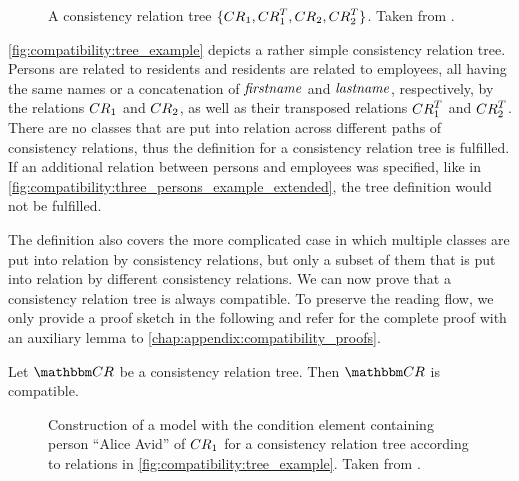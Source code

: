 \begin{figure}
    \centering
    
    \caption[A consistency relation tree]{A consistency relation tree $\setted{\consistencyrelation{CR}{1}, \consistencyrelation{CR}{1}^T, \consistencyrelation{CR}{2}, \consistencyrelation{CR}{2}^T}$. Taken from .}
    \label{fig:compatibility:tree_example}
\end{figure}

\begin{example}
\autoref{fig:compatibility:tree_example} depicts a rather simple consistency relation tree. 
Persons are related to residents and residents are related to employees, all having the same names or a concatenation of $\mathit{firstname}$ and $\mathit{lastname}$, respectively, by the relations $\consistencyrelation{CR}{1}$ and $\consistencyrelation{CR}{2}$, as well as their transposed relations $\consistencyrelation{CR}{1}^T$ and $\consistencyrelation{CR}{2}^T$.
There are no classes that are put into relation across different paths of consistency relations, thus the definition for a consistency relation tree is fulfilled. 
If an additional relation between persons and employees was specified, like in \autoref{fig:compatibility:three_persons_example_extended}, the tree definition would not be fulfilled.
\end{example}

The definition also covers the more complicated case in which multiple classes are put into relation by consistency relations, but only a subset of them that is put into relation by different consistency relations.
%
%
We can now prove that a consistency relation tree is always compatible.
To preserve the reading flow, we only provide a proof sketch in the following and refer for the complete proof with an auxiliary lemma to \autoref{chap:appendix:compatibility_proofs}.

\begin{theorem} \label{theorem:treecompatibility}
    Let $\consistencyrelationset{CR}$ be a consistency relation tree. Then $\consistencyrelationset{CR}$ is compatible.
\end{theorem}

\begin{figure}
    \centering
    
    \caption[Construction of a model tuple for a consistency relation tree]{Construction of a model with the condition element containing person \enquote{Alice Avid} of $\consistencyrelation{CR}{1}$ for a consistency relation tree according to relations in \autoref{fig:compatibility:tree_example}. Taken from .}
    \label{fig:compatibility:tree_construction_example}
\end{figure}

